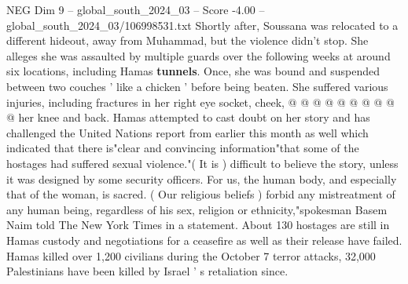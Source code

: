\begin{textsample}{NEG Dim 9 – global\_south\_2024\_03 – Score -4.00 – global\_south\_2024\_03/106998531.txt}
Shortly after, Soussana was relocated to a different hideout, away from Muhammad, but the violence didn't stop.
She alleges she was assaulted by multiple guards over the following weeks at around six locations, including Hamas \textbf{tunnels}.
Once, she was bound and suspended between two couches ' like a chicken ' before being beaten.
She suffered various injuries, including fractures in her right eye socket, cheek, @ @ @ @ @ @ @ @ @ @ her knee and back.
Hamas attempted to cast doubt on her story and has challenged the United Nations report from earlier this month as well which indicated that there is"clear and convincing information"that some of the hostages had suffered sexual violence."( It is ) difficult to believe the story, unless it was designed by some security officers.
For us, the human body, and especially that of the woman, is sacred. ( Our religious beliefs ) forbid any mistreatment of any human being, regardless of his sex, religion or ethnicity,"spokesman Basem Naim told The New York Times in a statement.
About 130 hostages are still in Hamas custody and negotiations for a ceasefire as well as their release have failed.
Hamas killed over 1,200 civilians during the October 7 terror attacks, 32,000 Palestinians have been killed by Israel ' s retaliation since.

\end{textsample}
